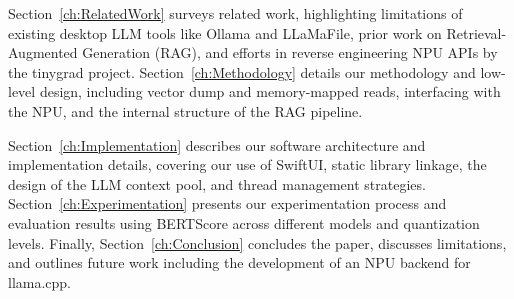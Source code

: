 Section~\ref{ch:RelatedWork} surveys related work, highlighting limitations of existing desktop LLM tools like Ollama and LLaMaFile, prior work on Retrieval-Augmented Generation (RAG), and efforts in reverse engineering NPU APIs by the tinygrad project. Section~\ref{ch:Methodology} details our methodology and low-level design, including vector dump and memory-mapped reads, interfacing with the NPU, and the internal structure of the RAG pipeline.

Section~\ref{ch:Implementation} describes our software architecture and implementation details, covering our use of SwiftUI, static library linkage, the design of the LLM context pool, and thread management strategies. Section~\ref{ch:Experimentation} presents our experimentation process and evaluation results using BERTScore across different models and quantization levels. Finally, Section~\ref{ch:Conclusion} concludes the paper, discusses limitations, and outlines future work including the development of an NPU backend for llama.cpp.